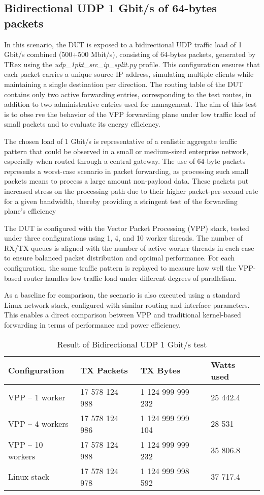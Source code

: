 \subsection{Bidirectional UDP 1 Gbit/s of 64-bytes packets}
In this scenario, the DUT is exposed to a bidirectional UDP traffic load of 1\,Gbit/s combined (500+500 Mbit/s), 
consisting of 64-bytes packets, generated by TRex using the \textit{udp\_1pkt\_src\_ip\_split.py} profile. 
This configuration ensures that each packet carries a unique source IP address, simulating multiple clients while maintaining a single destination per direction. 
The routing table of the DUT contains only two active forwarding entries, corresponding to the test routes, in addition to two administrative entries used for management. 
The aim of this test is to observe the behavior of the VPP forwarding plane under low traffic load of small packets and to evaluate its energy efficiency.

The chosen load of 1 Gbit/s is representative of a realistic aggregate traffic pattern that could be observed in a small or medium-sized enterprise network, especially when routed through a central gateway.
The use of 64-byte packets represents a worst-case scenario in packet forwarding, as processing such small packets means to process a large amount non-payload data. 
These packets put increased stress on the processing path due to their higher packet-per-second rate for a given bandwidth, thereby providing a stringent test of the forwarding plane's efficiency

The DUT is configured with the Vector Packet Processing (VPP) stack, tested under three configurations using 1, 4, and 10 worker threads. 
The number of RX/TX queues is aligned with the number of active worker threads in each case to ensure balanced packet distribution and optimal performance. 
For each configuration, the same traffic pattern is replayed to measure how well the VPP-based router handles low traffic load under different degrees of parallelism.

As a baseline for comparison, the scenario is also executed using a standard Linux network stack, configured with similar routing and interface parameters. 
This enables a direct comparison between VPP and traditional kernel-based forwarding in terms of performance and power efficiency.

\begin{table}[h!]
\centering
\begin{tabular}{|l|l|l|l|}
\hline
\textbf{Configuration} & \textbf{TX Packets} & \textbf{TX Bytes} & \textbf{Watts used} \\
\hline
VPP -- 1 worker & 17 578 124 988 & 1 124 999 999 232 & 25 442.4 \\
VPP -- 4 workers & 17 578 124 986 & 1 124 999 999 104 & 28 531 \\
VPP -- 10 workers &  17 578 124 988 & 1 124 999 999 232 & 35 806.8 \\
Linux stack & 17 578 124 978 & 1 124 999 998 592 & 37 717.4 \\
\hline
\end{tabular}
\caption{Result of Bidirectional UDP 1 Gbit/s test}
\label{tab:udp:one}
\end{table}

